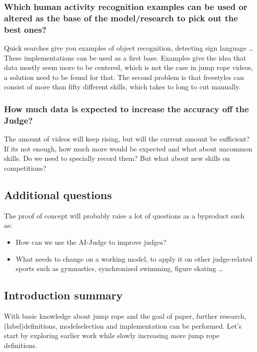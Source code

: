 \subsubsection{Which human activity recognition examples can be used or altered as the base of the model/research to pick out the best ones?}
Quick searches give you examples of object recognition, detecting sign language \dots
These implementations can be used as a first base.
Examples give the idea that data mostly seem more to be centered, which is not the case in jump rope videos, a solution need to be found for that. The second problem is that freestyles can consist of more than fifty different skills, which takes to long to cut manually.

\subsubsection{How much data is expected to increase the accuracy off the Judge?}

The amount of videos will keep rising, but will the current amount be sufficient? If its not enough, how much more would be expected and what about uncommon skills. Do we need to specially record them? But what about new skills on competitions?

\subsection{Additional questions}

The proof of concept will probably raise a lot of questions as a byproduct such as:

\begin{itemize}
    \item How can we use the AI-Judge to improve judges?
    \item What needs to change on a working model, to apply it on other judge-related sports such as gymnastics, synchronized swimming, figure skating \dots
\end{itemize}


\subsection{Introduction summary}

With basic knowledge about jump rope and the goal of paper, further research, (label)definitions, modelselection and implementation can be performed. Let's start by exploring earlier work while slowly increasing more jump rope definitions.



